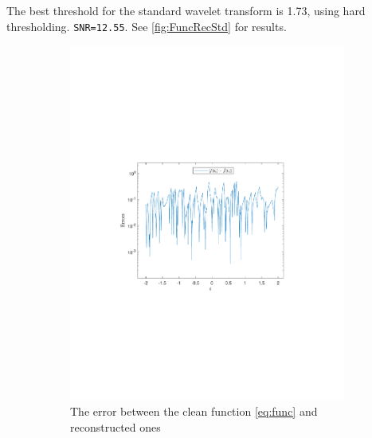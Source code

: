 \documentclass[a4paper]{article}
\begin{document}
	The best threshold for the standard wavelet transform is 1.73, using hard thresholding. \texttt{SNR=12.55}. See \cref{fig:FuncRecStd} for results.
\begin{figure}[H]
	\centering
	\begin{subfigure}{0.49\textwidth}
		\centering
		\includegraphics[trim={4cm 8cm 4cm 8cm},clip,width=1\textwidth]{Images/FuncRecStdError.pdf}
		\caption{The error between the clean function \cref{eq:func} and reconstructed ones}
		\label{sub:FuncRecStdError}
	\end{subfigure}
	\begin{subfigure}{0.49\textwidth}
		\centering

\end{subfigure}
\end{figure}
\end{document}

